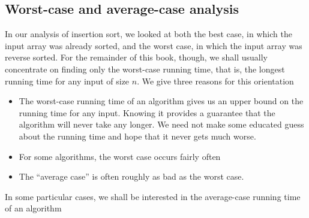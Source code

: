 \documentclass{report}
\begin{document}
    \subsection{Worst-case and average-case analysis}
    \bigbreak \noindent 
    In our analysis of insertion sort, we looked at both the best case, in which the input array was already sorted, and the worst case, in which the input array was reverse sorted. For the remainder of this book, though, we shall usually concentrate on finding only the worst-case running time, that is, the longest running time for any input of size $n$. We give three reasons for this orientation
    \begin{itemize}
        \item The worst-case running time of an algorithm gives us an upper bound on the running time for any input. Knowing it provides a guarantee that the algorithm will never take any longer. We need not make some educated guess about the running time and hope that it never gets much worse.
        \item For some algorithms, the worst case occurs fairly often
        \item  The “average case” is often roughly as bad as the worst case.
    \end{itemize}
    \bigbreak \noindent 
    In some particular cases, we shall be interested in the average-case running time of an algorithm
    \bigbreak \noindent 
\end{document}
